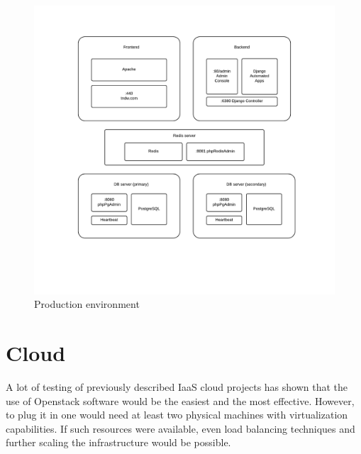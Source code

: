 \documentclass[thesis=B,english]{FITthesis}[2013/04/26]
\begin{document}
\begin{figure}[h!]
	\includegraphics[trim=2.5cm 2cm 2.5cm 2cm, clip=true, totalheight=390pt]{images/tndw-prod.pdf}
	\caption{Production environment}
	\label{fig:tndw-prod}
\end{figure}

\section{Cloud}

A lot of testing of previously described IaaS cloud projects has shown that the use of Openstack software would be the easiest and the most effective. However, to plug it in one would need at least two physical machines with virtualization capabilities. If such resources were available, even load balancing techniques and further scaling the infrastructure would be possible.

\end{document}
